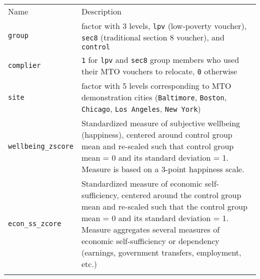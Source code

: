 \documentclass[]{article}
\begin{document}
\begin{longtable}[c]{@{}ll@{}}
\toprule\addlinespace
\begin{minipage}[b]{0.34\columnwidth}\raggedright
Name
\end{minipage} & \begin{minipage}[b]{0.59\columnwidth}\raggedright
Description
\end{minipage}
\\\addlinespace
\midrule\endhead
\begin{minipage}[t]{0.34\columnwidth}\raggedright
\texttt{group}
\end{minipage} & \begin{minipage}[t]{0.59\columnwidth}\raggedright
factor with 3 levels, \texttt{lpv} (low-poverty voucher), \texttt{sec8}
(traditional section 8 voucher), and \texttt{control}
\end{minipage}
\\\addlinespace
\begin{minipage}[t]{0.34\columnwidth}\raggedright
\texttt{complier}
\end{minipage} & \begin{minipage}[t]{0.59\columnwidth}\raggedright
\texttt{1} for \texttt{lpv} and \texttt{sec8} group members who used
their MTO vouchers to relocate, \texttt{0} otherwise
\end{minipage}
\\\addlinespace
\begin{minipage}[t]{0.34\columnwidth}\raggedright
\texttt{site}
\end{minipage} & \begin{minipage}[t]{0.59\columnwidth}\raggedright
factor with 5 levels corresponding to MTO demonstration cities
(\texttt{Baltimore}, \texttt{Boston}, \texttt{Chicago},
\texttt{Los Angeles}, \texttt{New York})
\end{minipage}
\\\addlinespace
\begin{minipage}[t]{0.34\columnwidth}\raggedright
\texttt{wellbeing\_zscore}
\end{minipage} & \begin{minipage}[t]{0.59\columnwidth}\raggedright
Standardized measure of subjective wellbeing (happiness), centered
around control group mean and re-scaled such that control group mean = 0
and its standard deviation = 1. Measure is based on a 3-point happiness
scale.
\end{minipage}
\\\addlinespace
\begin{minipage}[t]{0.34\columnwidth}\raggedright
\texttt{econ\_ss\_zcore}
\end{minipage} & \begin{minipage}[t]{0.59\columnwidth}\raggedright
Standardized measure of economic self-sufficiency, centered around the
control group mean and re-scaled such that the control group mean = 0
and its standard deviation = 1. Measure aggregates several measures of
economic self-sufficiency or dependency (earnings, government transfers,
employment, etc.)
\end{minipage}
\\\addlinespace
\bottomrule
\end{longtable}
\end{document}
